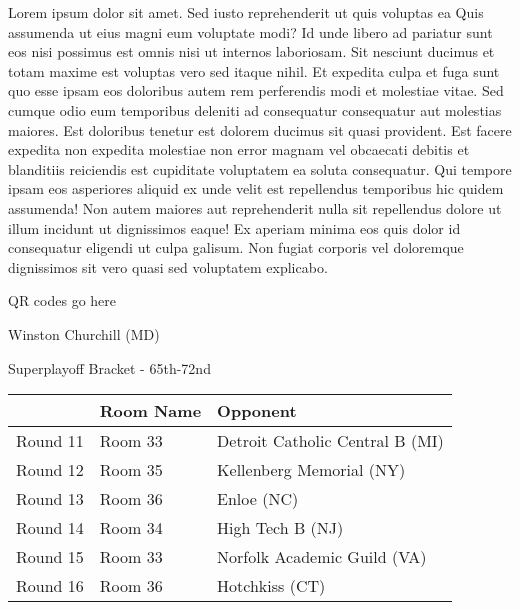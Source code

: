 \documentclass{article}%
\begin{document}
\vspace*{8pt}%
\linebreak%
\newline%
\newline%
    Lorem ipsum dolor sit amet. Sed iusto reprehenderit ut quis voluptas ea Quis assumenda ut eius magni eum voluptate modi? Id unde libero ad pariatur sunt eos nisi possimus est omnis nisi ut internos laboriosam. Sit nesciunt ducimus et totam maxime est voluptas vero sed itaque nihil. Et expedita culpa et fuga sunt quo esse ipsam eos doloribus autem rem perferendis modi et molestiae vitae.\newline%
\newline%
    Sed cumque odio eum temporibus deleniti ad consequatur consequatur aut molestias maiores. Est doloribus tenetur est dolorem ducimus sit quasi provident. Est facere expedita non expedita molestiae non error magnam vel obcaecati debitis et blanditiis reiciendis est cupiditate voluptatem ea soluta consequatur. Qui tempore ipsam eos asperiores aliquid ex unde velit est repellendus temporibus hic quidem assumenda!\newline%
\newline%
    Non autem maiores aut reprehenderit nulla sit repellendus dolore ut illum incidunt ut dignissimos eaque! Ex aperiam minima eos quis dolor id consequatur eligendi ut culpa galisum. Non fugiat corporis vel doloremque dignissimos sit vero quasi sed voluptatem explicabo.\newline%
\newline%
\vspace*{30pt}%
\begin{center}%
\begin{Huge}%
QR codes go here%
\end{Huge}%
\end{center}%
\newpage%
\begin{center}%
\begin{Huge}%
Winston Churchill (MD)%
\end{Huge}%
\vspace*{8pt}%
\linebreak%
\begin{Large}%
Superplayoff Bracket {-} 65th{-}72nd%
\end{Large}%
\end{center}%
%
\begin{tabularx}{\textwidth}{|c|Y|Y|}%
\hline%
&Room Name&Opponent\\%
\hline%
Round 11&Room 33&Detroit Catholic Central B (MI)\\%
Round 12&Room 35&Kellenberg Memorial (NY)\\%
Round 13&Room 36&Enloe (NC)\\%
Round 14&Room 34&High Tech B (NJ)\\%
Round 15&Room 33&Norfolk Academic Guild (VA)\\%
Round 16&Room 36&Hotchkiss (CT)\\%
\hline%
\end{tabularx}%
\end{document}
